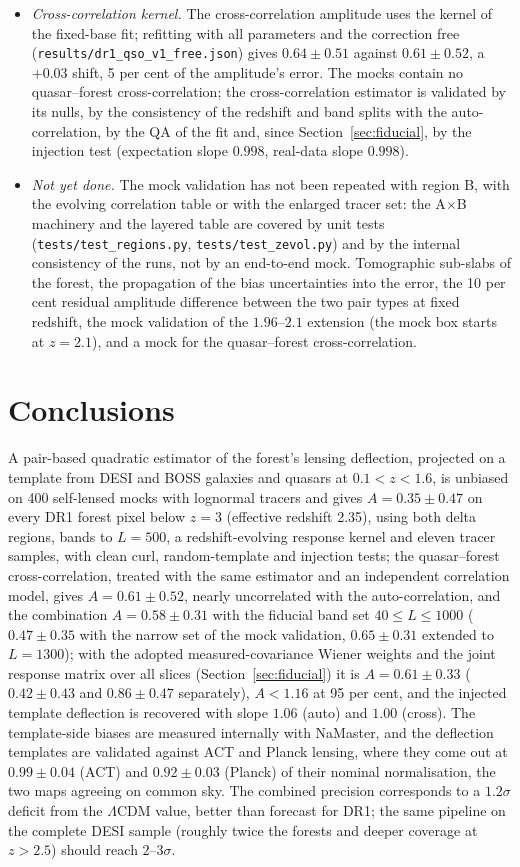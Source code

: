 \documentclass[11pt,a4paper]{article}
\begin{document}
\begin{itemize}
\item \emph{Cross-correlation kernel.} The cross-correlation amplitude uses the kernel of the fixed-base fit; refitting with all parameters and the correction free (\texttt{results/dr1\_qso\_v1\_free.json}) gives $0.64\pm0.51$ against $0.61\pm0.52$, a $+0.03$ shift, 5 per cent of the amplitude's error. The mocks contain no quasar--forest cross-correlation; the cross-correlation estimator is validated by its nulls, by the consistency of the redshift and band splits with the auto-correlation, by the QA of the fit and, since Section~\ref{sec:fiducial}, by the injection test (expectation slope $0.998$, real-data slope $0.998$).
\item \emph{Not yet done.} The mock validation has not been repeated with region B, with the evolving correlation table or with the enlarged tracer set: the A$\times$B machinery and the layered table are covered by unit tests (\texttt{tests/test\_regions.py}, \texttt{tests/test\_zevol.py}) and by the internal consistency of the runs, not by an end-to-end mock. Tomographic sub-slabs of the forest, the propagation of the bias uncertainties into the error, the 10 per cent residual amplitude difference between the two pair types at fixed redshift, the mock validation of the $1.96$--$2.1$ extension (the mock box starts at $z=2.1$), and a mock for the quasar--forest cross-correlation.
\end{itemize}

\section{Conclusions}
A pair-based quadratic estimator of the forest's lensing deflection, projected on a template from DESI and BOSS galaxies and quasars at $0.1<z<1.6$, is unbiased on 400 self-lensed mocks with lognormal tracers and gives $A=0.35\pm0.47$ on every DR1 forest pixel below $z=3$ (effective redshift 2.35), using both delta regions, bands to $L=500$, a redshift-evolving response kernel and eleven tracer samples, with clean curl, random-template and injection tests; the quasar--forest cross-correlation, treated with the same estimator and an independent correlation model, gives $A=0.61\pm0.52$, nearly uncorrelated with the auto-correlation, and the combination $A=0.58\pm0.31$ with the fiducial band set $40\le L\le1000$ ($0.47\pm0.35$ with the narrow set of the mock validation, $0.65\pm0.31$ extended to $L=1300$); with the adopted measured-covariance Wiener weights and the joint response matrix over all slices (Section~\ref{sec:fiducial}) it is $A=0.61\pm0.33$ ($0.42\pm0.43$ and $0.86\pm0.47$ separately), $A<1.16$ at 95 per cent, and the injected template deflection is recovered with slope $1.06$ (auto) and $1.00$ (cross). The template-side biases are measured internally with NaMaster, and the deflection templates are validated against ACT and Planck lensing, where they come out at $0.99\pm0.04$ (ACT) and $0.92\pm0.03$ (Planck) of their nominal normalisation, the two maps agreeing on common sky. The combined precision corresponds to a $1.2\sigma$ deficit from the $\Lambda$CDM value, better than forecast for DR1; the same pipeline on the complete DESI sample (roughly twice the forests and deeper coverage at $z>2.5$) should reach $2$--$3\sigma$.



\end{document}

